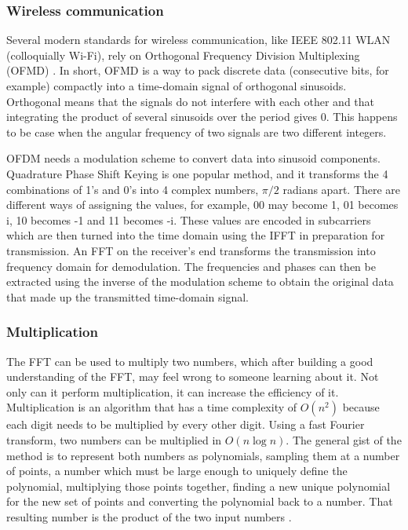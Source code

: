 \subsubsection{Wireless communication}
Several modern standards for wireless communication, like IEEE 802.11 WLAN (colloquially Wi-Fi), rely on Orthogonal Frequency Division Multiplexing (OFMD) \cite{GnanishivaramNeeraja2014}. In short, OFMD is a way to pack discrete data (consecutive bits, for example) compactly into a time-domain signal of orthogonal sinusoids. Orthogonal means that the signals do not interfere with each other and that integrating the product of several sinusoids over the period gives 0. This happens to be case when the angular frequency of two signals are two different integers. 

OFDM needs a modulation scheme to convert data into sinusoid components. Quadrature Phase Shift Keying is one popular method, and it transforms the 4 combinations of 1's and 0's into 4 complex numbers, $\pi/2$ radians apart. There are different ways of assigning the values, for example, 00 may become 1, 01 becomes i, 10 becomes -1 and 11 becomes -i. These values are encoded in subcarriers which are then turned into the time domain using the IFFT in preparation for transmission. An FFT on the receiver's end transforms the transmission into frequency domain for demodulation. The frequencies and phases can then be extracted using the inverse of the modulation scheme to obtain the original data that made up the transmitted time-domain signal.

\subsubsection{Multiplication}
The FFT can be used to multiply two numbers, which after building a good understanding of the FFT, may feel wrong to someone learning about it. Not only can it perform multiplication, it can increase the efficiency of it. Multiplication is an algorithm that has a time complexity of $O(n^2)$ because each digit needs to be multiplied by every other digit. Using a fast Fourier transform, two numbers can be multiplied in $O(n \log n)$. The general gist of the method is to represent both numbers as polynomials, sampling them at a number of points, a number which must be large enough to uniquely define the polynomial, multiplying those points together, finding a new unique polynomial for the new set of points and converting the polynomial back to a number. That resulting number is the product of the two input numbers \cite{Reducible2020}.


